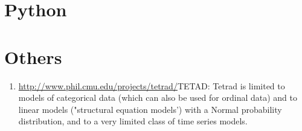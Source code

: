 \documentclass{article}
\begin{document}
\section{Python}

\section{Others}
\begin{enumerate}
\item \url{http://www.phil.cmu.edu/projects/tetrad/}{TETAD}: Tetrad is limited to models of categorical data (which can also be used for ordinal data) and to linear models ("structural equation models') with a Normal probability distribution, and to a very limited class of time series models. 

\end{enumerate}




\end{document}
